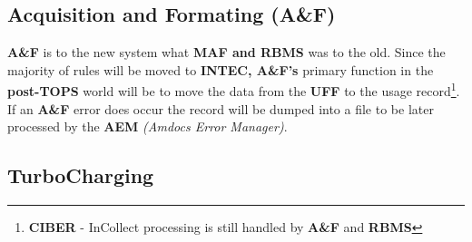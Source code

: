 \documentclass[12pt,twoside]{article}
\begin{document}
\subsection{Acquisition and Formating (A\&F)}
\label{sec-3-1}

  \textbf{A\&F} is to the new system what \textbf{MAF and RBMS} was to the old. Since
  the majority of rules will be moved to \textbf{INTEC, A\&F's} primary
  function in the \textbf{post-TOPS} world will be to move the data from the
  \textbf{UFF} to the usage record\footnote{\textbf{CIBER} - InCollect processing is still handled by \textbf{A\&F} and \textbf{RBMS}
 }.  If an \textbf{A\&F} error does
  occur the record will be dumped into a file to be later processed by
  the \textbf{AEM} \emph{(Amdocs Error Manager)}.
  
\subsection{TurboCharging}
\label{sec-3-2}
\end{document}
